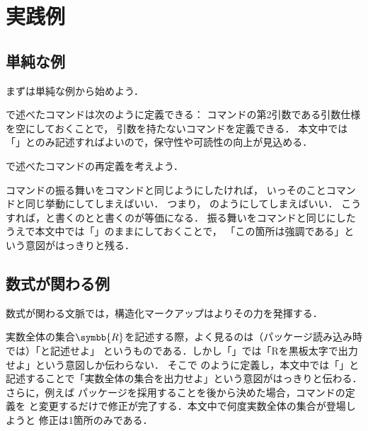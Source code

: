 \chapter{実践例} \label{chap:ex}

\section{単純な例} \label{sec:simple}

まずは単純な例から始めよう．

\begin{Ex} \label{Ex:cppnewdocumentcommand}
    で述べたコマンドは次のように定義できる：
    コマンドの第2引数である引数仕様を空にしておくことで，
    引数を持たないコマンドを定義できる．
    本文中では「」とのみ記述すればよいので，保守性や可読性の向上が見込める．
\end{Ex}

で述べたコマンドの再定義を考えよう．

\begin{Ex} \label{Ex:emphbfdef}
    コマンドの振る舞いをコマンドと同じようにしたければ，
    いっそのことコマンドと同じ挙動にしてしまえばいい．
    つまり，
    のようにしてしまえばいい．
    こうすれば，と書くのとと書くのが等価になる．
    振る舞いをコマンドと同じにしたうえで本文中では「」のままにしておくことで，
    「この箇所は強調である」という意図がはっきりと残る．
\end{Ex}

\section{数式が関わる例} \label{sec:math}

数式が関わる文脈では，構造化マークアップはよりその力を発揮する．

\begin{Ex} \label{Ex:number}
    実数全体の集合\(\symbb{R}\)を記述する際，よく見るのは（パッケージ読み込み時では）「と記述せよ」
    というものである．しかし「」では「Rを黒板太字で出力せよ」という意図しか伝わらない．
    そこで
    のように定義し，本文中では「」と記述することで「実数全体の集合を出力せよ」という意図がはっきりと伝わる．
    さらに，例えば
    パッケージを採用することを後から決めた場合，コマンドの定義を
    と変更するだけで修正が完了する．本文中で何度実数全体の集合が登場しようと
    修正は1箇所のみである．
\end{Ex}

